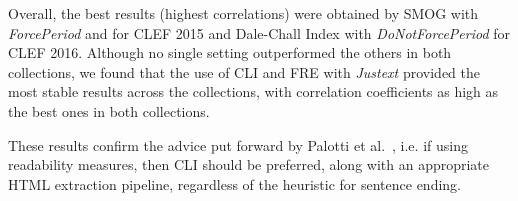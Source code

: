 Overall, the best results (highest correlations) were obtained by SMOG with \textit{ForcePeriod} and  for CLEF 2015 and Dale-Chall Index with \textit{DoNotForcePeriod}  for CLEF 2016. Although no single setting outperformed the others in both collections, we found that the use of CLI and FRE with \textit{Justext} provided the most stable results across the collections, with correlation coefficients as high as the best ones in both collections.

These results confirm the advice put forward by Palotti et al.~\cite{}, i.e. if using readability measures, then CLI should be preferred, along with an appropriate HTML extraction pipeline, regardless of the heuristic for sentence ending.






